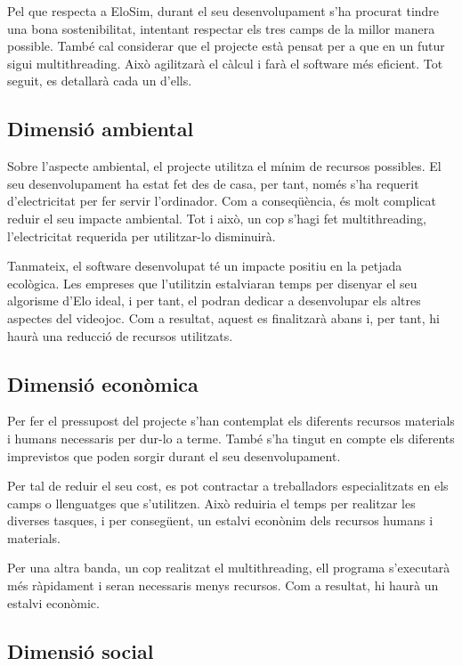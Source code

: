 \documentclass[a4paper]{article}
\begin{document}
Pel que respecta a EloSim, durant el seu desenvolupament s'ha procurat tindre una bona sostenibilitat, intentant respectar els tres camps de la millor manera possible. També cal considerar que el projecte està pensat per a que en un futur sigui multithreading. Això agilitzarà el càlcul i farà el software més eficient. Tot seguit, es detallarà cada un d'ells.

\subsection{Dimensió ambiental}

Sobre l'aspecte ambiental, el projecte utilitza el mínim de recursos possibles. El seu desenvolupament ha estat fet des de casa, per tant, només s'ha requerit d'electricitat per fer servir l'ordinador. Com a conseqüència, és molt complicat reduir el seu impacte ambiental. Tot i això, un cop s'hagi fet multithreading, l'electricitat requerida per utilitzar-lo disminuirà.

Tanmateix, el software desenvolupat té un impacte positiu en la petjada ecològica. Les empreses que l'utilitzin estalviaran temps per disenyar el seu algorisme d'Elo ideal, i per tant, el podran dedicar a desenvolupar els altres aspectes del videojoc. Com a resultat,  aquest es finalitzarà abans i, per tant, hi haurà una reducció de recursos utilitzats.

\subsection{Dimensió econòmica}

Per fer el pressupost del projecte s'han contemplat els diferents recursos materials i humans necessaris per dur-lo a terme. També s'ha tingut en compte els diferents imprevistos que poden sorgir durant el seu desenvolupament.

Per tal de reduir el seu cost, es pot contractar a treballadors especialitzats en els camps o llenguatges que s'utilitzen. Això reduiria el temps per realitzar les diverses tasques, i per consegüent, un estalvi econònim dels recursos humans i materials.

Per una altra banda, un cop realitzat el multithreading, ell programa s'executarà més ràpidament i seran necessaris menys recursos. Com a resultat, hi haurà un estalvi econòmic.

\subsection{Dimensió social}
\end{document}
